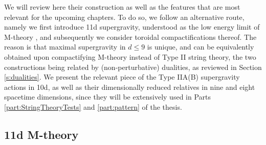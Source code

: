 We will review here their construction as well as the features that are most relevant for the upcoming chapters. To do so, we follow an alternative route, namely we first introduce 11d supergravity, understood as the low energy limit of M-theory \cite{Witten:1995ex}, and subsequently we consider toroidal compactifications thereof. The reason is that maximal supergravity in $d\leq 9$ is unique, and can be equivalently obtained upon compactifying M-theory instead of Type II string theory, the two constructions being related by (non-perturbative) dualities, as reviewed in Section \ref{s:dualities}. We present the relevant piece of the Type IIA(B) supergravity actions in 10d, as well as their dimensionally reduced relatives in nine and eight spacetime dimensions, since they will be extensively used in Parts \ref{part:StringTheoryTests} and \ref{part:pattern} of the thesis.

\subsection{11d M-theory}\label{ss:Mthy11d}

